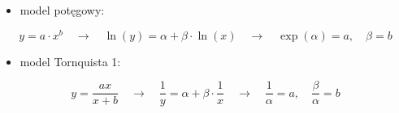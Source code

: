 \documentclass[polish,]{book}
\providecommand{\tightlist}{%
  \setlength{\itemsep}{0pt}\setlength{\parskip}{0pt}}
\begin{document}
\begin{itemize}
\tightlist
\item
  model potęgowy:
\end{itemize}

\begin{equation}
y=a\cdot x^b \quad \longrightarrow \quad \ln(y)=\alpha+\beta\cdot \ln(x)\quad \longrightarrow \quad \exp(\alpha)= a,\quad \beta=b
\label{eq:n08}
\end{equation}

\begin{itemize}
\tightlist
\item
  model Tornquista 1:
\end{itemize}

\begin{equation}
y=\frac{ax}{x+b} \quad \longrightarrow \quad \frac{1}{y}=\alpha+\beta\cdot \frac{1}{x}\quad \longrightarrow \quad \frac{1}{\alpha}= a,\quad \frac{\beta}{\alpha}=b
\label{eq:n09}
\end{equation}
\end{document}
